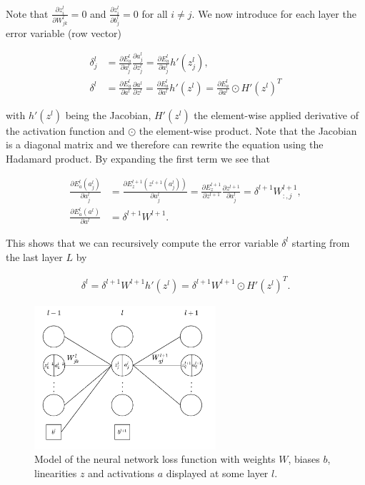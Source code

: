 \documentclass[english,11pt,a4paper]{article}
\begin{document}
Note that $\frac{\partial z^l_i}{\partial W^l_{jk}} = 0$ and $\frac{\partial z^l_i}{\partial b_j^l} = 0$ for all $i \neq j$. We now introduce for each layer the error variable (row vector)

\begin{equation}
	\begin{aligned}
		\delta^l_j &= \frac{\partial E^l_a}{\partial a^l_j} \frac{\partial a^l_j}{\partial z^l_j} =
		\frac{\partial E^l_a}{\partial a^l_j} h'(z^l_j), \\
		\delta^l &= \frac{\partial E^l_a}{\partial a^l} \frac{\partial a^l}{\partial z^l} =
		\frac{\partial E^l_a}{\partial a^l} h'(z^l) = \frac{\partial E^l_a}{\partial a^l} \odot H'(z^l)^T
	\end{aligned}
\end{equation}

with $h'(z^l)$ being the Jacobian, $H'(z^l)$ the element-wise applied derivative of the activation function and $\odot$ the element-wise product. Note that the Jacobian is a diagonal matrix and we therefore can rewrite the equation using the Hadamard product. By expanding the first term we see that

\begin{equation}
	\begin{aligned}
		\frac{\partial E^l_a(a^l_j)}{\partial a^l_j} &= 
		\frac{\partial E^{l+1}_z(z^{l+1}(a^l_j))}{\partial a^l_j} = 
		\frac{\partial E^{l+1}_z}{\partial z^{l+1}} \frac{\partial z^{l+1}}{\partial a^l_j} = 
		\delta^{l+1}W^{l+1}_{:,j}, \\
		\frac{\partial E^l_a(a^l)}{\partial a^l} &= \delta^{l+1}W^{l+1}.
	\end{aligned}
\end{equation}

This shows that we can recursively compute the error variable $\delta^l$ starting from the last layer $L$ by

\begin{equation}
	\begin{aligned}
		\delta^l = \delta^{l+1}W^{l+1} h'(z^l) = \delta^{l+1}W^{l+1} \odot H'(z^l)^T.
	\end{aligned}
\end{equation}

\begin{figure}[t]
	\centering
	\includegraphics[width=0.6\textwidth]{images/backprop}
	\caption{Model of the neural network loss function with weights $W$, biases $b$, linearities $z$ and activations $a$ displayed at some layer $l$.}
	\label{fig:backprop}
\end{figure}
\end{document}
